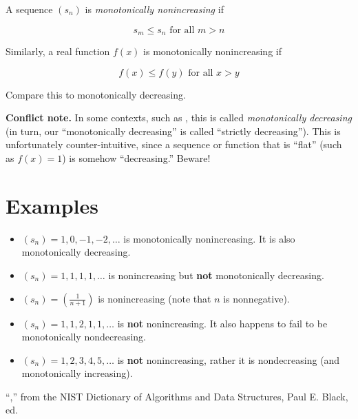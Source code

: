 \documentclass{article}
\begin{document}
A sequence $(s_n)$ is \emph{monotonically nonincreasing} if 

$$ s_m \le s_n \text{ for all } m > n $$

Similarly, a real function $f(x)$ is monotonically nonincreasing if 

$$ f(x) \le f(y) \text{ for all } x > y $$

Compare this to monotonically decreasing.

\textbf{Conflict note.} In some contexts, such as \cite{NIST}, this is called \emph{monotonically decreasing} (in turn, our ``monotonically decreasing'' is called ``strictly decreasing'').  This is unfortunately counter-intuitive, since a sequence or function that is ``flat'' (such as $f(x) = 1$) is somehow ``decreasing.''  Beware!

\section{Examples}

\begin{itemize}

\item $(s_n) = 1, 0, -1, -2, \ldots$ is monotonically nonincreasing.  It is also monotonically decreasing.

\item $(s_n) = 1, 1, 1, 1, \ldots$ is nonincreasing but {\bf not} monotonically decreasing.

\item $(s_n) = (\frac{1}{n+1})$  is nonincreasing (note that $n$ is nonnegative).

\item $(s_n) = 1, 1, 2, 1, 1, \ldots$ is {\bf not} nonincreasing.  It also happens to fail to be monotonically nondecreasing.

\item $(s_n) = 1, 2, 3, 4, 5, \ldots$ is {\bf not} nonincreasing, rather it is nondecreasing (and monotonically increasing).

\end{itemize}

\begin{thebibliography}{3}
 ``,'' from the NIST Dictionary of Algorithms and Data Structures, Paul E. Black, ed.
\end{thebibliography}
\end{document}
